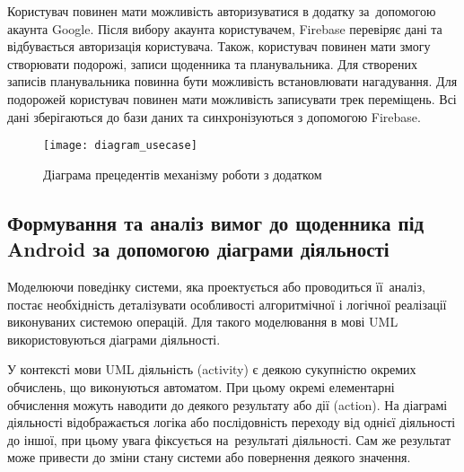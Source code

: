 \documentclass[../main.tex]{subfiles}
\begin{document}
Користувач повинен мати можливість авторизуватися в додатку за~допомогою акаунта Google. Після вибору акаунта користувачем, Firebase перевіряє дані та відбувається авторизація користувача. Також, користувач повинен мати змогу створювати подорожі, записи щоденника та планувальника. Для створених записів планувальника повинна бути можливість встановлювати нагадування. Для подорожей користувач повинен мати можливість записувати трек переміщень. Всі дані зберігаються до бази даних та синхронізуються з допомогою Firebase.

\begin{figure}[H]
	\centering
	\texttt{[image: diagram\_usecase]}
	\caption{Діаграма прецедентів механізму роботи з додатком}
	\label{diagram:usecase}
\end{figure}




\subsection{Формування та аналіз вимог до щоденника  під Android за допомогою діаграми діяльності}
Моделюючи поведінку системи, яка проектується або проводиться її~аналіз, постає необхідність деталізувати особливості алгоритмічної і логічної реалізації виконуваних системою операцій. Для такого моделювання в мові UML використовуються діаграми діяльності.

У контексті мови UML діяльність (activity) є деякою сукупністю окремих обчислень, що виконуються автоматом. При цьому окремі елементарні обчислення можуть наводити до деякого результату або дії (action). На діаграмі діяльності відображається логіка або послідовність переходу від однієї діяльності до іншої, при цьому увага фіксується на~результаті діяльності. Сам же результат може привести до зміни стану системи або повернення деякого значення.
\end{document}
